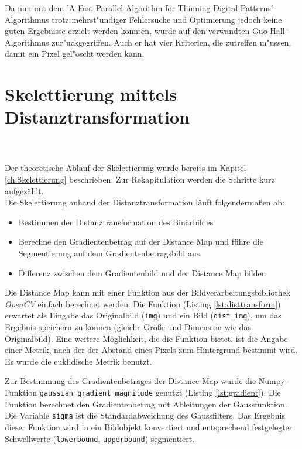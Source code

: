 Da nun mit dem 'A Fast Parallel Algorithm for Thinning Digital Patterns'-Algorithmus trotz mehrst"undiger Fehlersuche und Optimierung jedoch keine guten Ergebnisse erzielt werden konnten, wurde auf den verwandten Guo-Hall-Algorithmus zur"uckgegriffen. Auch er hat vier Kriterien, die zutreffen m"ussen, damit ein Pixel gel"oscht werden kann.

\section{Skelettierung mittels Distanztransformation}
\label{sec:impl_distanztrans}
\\\\
Der theoretische Ablauf der Skelettierung wurde bereits im Kapitel \ref{ch:Skelettierung} beschrieben. Zur
Rekapitulation werden die Schritte kurz aufgezählt. \\
Die Skelettierung anhand der Distanztransformation läuft folgendermaßen ab:
\begin{itemize}
\item Bestimmen der Distanztransformation des Binärbildes
\item Berechne den Gradientenbetrag auf der Distance Map und führe die Segmentierung auf dem Gradientenbetragsbild aus.
\item Differenz zwischen dem Gradientenbild und der Distance Map bilden
\end{itemize}
Die Distance Map kann mit einer Funktion aus der Bildverarbeitungsbibliothek \emph{OpenCV} einfach berechnet
werden. Die Funktion (Listing \ref{lst:disttransform}) erwartet als Eingabe das Originalbild (\texttt{img}) und ein Bild (\texttt{dist\_img}), um
das Ergebnis speichern zu können (gleiche Größe und Dimension wie das Originalbild). Eine weitere Möglichkeit, die die Funktion bietet, ist die Angabe einer Metrik, nach der der Abstand eines Pixels zum
Hintergrund bestimmt wird. Es wurde die euklidische Metrik benutzt.

Zur Bestimmung des Gradientenbetrages der Distance Map wurde die Numpy-Funktion \texttt{gaussian\_gradient\_magnitude} genutzt (Listing \ref{lst:gradient}). Die Funktion berechnet den Gradientenbetrag mit Ableitungen
der Gaussfunktion. Die Variable \texttt{sigma} ist die Standardabweichung 
des Gaussfilters. Das Ergebnis dieser Funktion wird in ein Bildobjekt
konvertiert und entsprechend festgelegter Schwellwerte (\texttt{lowerbound}, \texttt{upperbound}) segmentiert.
